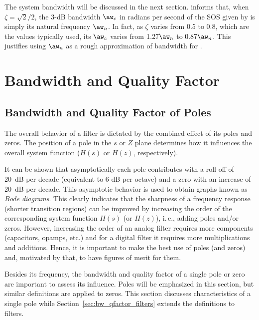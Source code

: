The system bandwidth will be discussed in the next section.
 informs that, when $\zeta=\sqrt{2}/2$, the 3-dB bandwidth $\aw_c$ in radians per second of
the SOS given by  is simply its 
natural frequency $\aw_n$. In fact, as $\zeta$ varies from 0.5 to 0.8, which are
the values typically used,
its $\aw_c$ varies from $1.27 \aw_n$ to $0.87 \aw_n$. This justifies using
$\aw_n$ as a rough approximation of bandwidth for .

\section{{\akadvanced} Bandwidth and Quality Factor}

\subsection{Bandwidth and Quality Factor of Poles}
\label{sec:bw_qfactor_poles}

The overall behavior of a filter is dictated by the combined effect of its poles and zeros.
The position of a pole in the $s$ or $Z$ plane determines how it influences the overall system function ($H(s)$ or $H(z)$, respectively). 

It can be shown that asymptotically each pole contributes with a roll-off of 20~dB per decade (equivalent to 6 dB per octave) and a zero with an increase of 20~dB per decade.  This asymptotic behavior is used to obtain graphs known as \emph{Bode diagrams}. This clearly indicates that 
the sharpness of a frequency response (shorter transition regions) can be improved by increasing the order of the corresponding system function $H(s)$ (or $H(z)$), i.\,e., adding poles and/or zeros. 
However, increasing the order of an analog filter requires more components (capacitors, opamps, etc.) and for a digital filter it requires more multiplications and additions. 
Hence, it is important to make the best use of poles (and zeros) and, motivated by that, to have figures of merit for them. 

Besides its frequency, the bandwidth and quality factor of a single pole or zero are important to assess its influence.
Poles will be emphasized in this section, but similar definitions are applied to zeros.
This section discusses characteristics of a single pole while Section~\ref{sec:bw_qfactor_filters} extends the definitions to filters.


